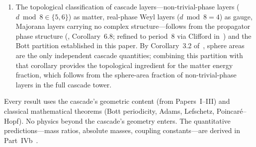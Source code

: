 \documentclass[12pt,a4paper]{article}
\begin{document}
\begin{enumerate}
\item The topological classification of cascade layers---non-trivial-phase layers
($d\bmod 8\in\{5,6\}$) as matter, real-phase Weyl layers ($d\bmod 8=4$) as gauge,
Majorana layers carrying no complex structure---follows from the propagator phase
structure (\cite{part2}, Corollary~6.8; refined to period~8 via
Clifford in~\cite{part3}) and the Bott partition established in this paper.
By Corollary~3.2 of~\cite{part0}, sphere areas are the only independent cascade
quantities; combining this partition with that corollary provides the topological ingredient
for the matter energy fraction, which follows from the sphere-area fraction of
non-trivial-phase layers in the full cascade tower.
\end{enumerate}

Every result uses the cascade's geometric content (from Papers~I--III) and classical
mathematical theorems (Bott periodicity, Adams, Lefschetz, Poincar\'{e}--Hopf). No physics
beyond the cascade's geometry enters. The quantitative predictions---mass ratios, absolute
masses, coupling constants---are derived in Part~IVb~\cite{part4b}.
\end{document}
